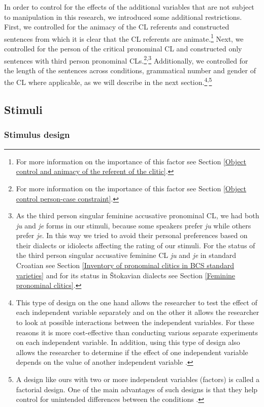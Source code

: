 In order to control for the effects of the additional variables that are not subject to manipulation in this research, we introduced some additional restrictions. First, we controlled for the animacy of the CL referents and constructed sentences from which it is clear that the CL referents are animate.\footnote{For more information on the importance of this factor see Section \ref{Object control and animacy of the referent of the clitic}.} Next, we controlled for the person of the critical pronominal CL and constructed only sentences with third person pronominal CLs.\footnote{For more information on the importance of this factor see Section \ref{Object control person-case constraint}.}\textsuperscript{,}\footnote{As the third person singular feminine accusative pronominal CL, we had both \textit{ju} and \textit{je} forms in our stimuli, because some speakers prefer \textit{ju} while others prefer \textit{je}. In this way we tried to avoid their personal preferences based on their dialects or idiolects affecting the rating of our stimuli. For the status of the third person singular accusative feminine CL \textit{ju} and \textit{je} in standard Croatian see Section \ref{Inventory of pronominal clitics in BCS standard varieties} and for its status in Štokavian dialects see Section \ref{Feminine pronominal clitics}.} Additionally, we controlled for the length of the sentences across conditions, grammatical number and gender of the CL where applicable, as we will describe in the next section.\footnote{This type of design on the one hand allows the researcher to test the effect of each independent variable separately and on the other it allows the researcher to look at possible interactions between the independent variables. For these reasons it is more cost-effective than conducting various separate experiments on each independent variable. In addition, using this type of design also allows the researcher to determine if the effect of one independent variable depends on the value of another independent variable \citep[cf.][121]{AGM13}.}\textsuperscript{,}\footnote{A design like ours with two or more independent variables (factors) is called a factorial design. One of the main advantages of such designs is that they help control for unintended differences between the conditions \citep[][14]{StoweKaan06}.} 

\subsection{Stimuli}
\label{Stimuli}
\subsubsection{Stimulus design}

